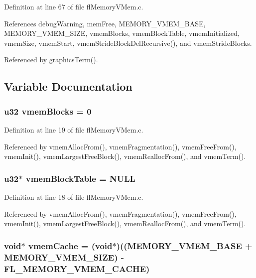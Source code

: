 Definition at line 67 of file fl\-Memory\-VMem.c.

References debug\-Warning, mem\-Free, MEMORY\_\-VMEM\_\-BASE, MEMORY\_\-VMEM\_\-SIZE, vmem\-Blocks, vmem\-Block\-Table, vmem\-Initialized, vmem\-Size, vmem\-Start, vmem\-Stride\-Block\-Del\-Recursive(), and vmem\-Stride\-Blocks.

Referenced by graphics\-Term().

\subsection{Variable Documentation}
\subsubsection{\setlength{\rightskip}{0pt plus 5cm}u32 {\bf vmem\-Blocks} = 0}\label{flMemoryVMem_8c_76eb0f2936c402d05c70a0e710407d6a}




Definition at line 19 of file fl\-Memory\-VMem.c.

Referenced by vmem\-Alloc\-From(), vmem\-Fragmentation(), vmem\-Free\-From(), vmem\-Init(), vmem\-Largest\-Free\-Block(), vmem\-Realloc\-From(), and vmem\-Term().
\subsubsection{\setlength{\rightskip}{0pt plus 5cm}u32$\ast$ {\bf vmem\-Block\-Table} = NULL}\label{flMemoryVMem_8c_c26d629e42eb543afddfb13534009a59}




Definition at line 18 of file fl\-Memory\-VMem.c.

Referenced by vmem\-Alloc\-From(), vmem\-Fragmentation(), vmem\-Free\-From(), vmem\-Init(), vmem\-Largest\-Free\-Block(), vmem\-Realloc\-From(), and vmem\-Term().
\subsubsection{\setlength{\rightskip}{0pt plus 5cm}void$\ast$ {\bf vmem\-Cache} = (void$\ast$)((MEMORY\_\-VMEM\_\-BASE + MEMORY\_\-VMEM\_\-SIZE) - FL\_\-MEMORY\_\-VMEM\_\-CACHE)}\label{flMemoryVMem_8c_e7f60e45abdf4f11468a2444c8a315bf}




